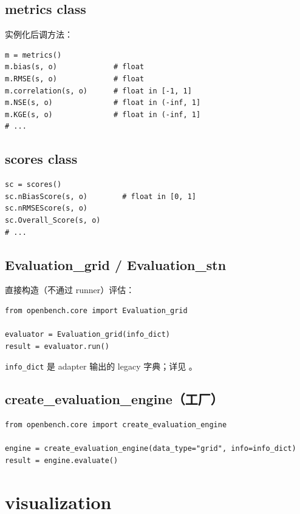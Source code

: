 \subsection{metrics class}

实例化后调方法：

\begin{verbatim}
m = metrics()
m.bias(s, o)             # float
m.RMSE(s, o)             # float
m.correlation(s, o)      # float in [-1, 1]
m.NSE(s, o)              # float in (-inf, 1]
m.KGE(s, o)              # float in (-inf, 1]
# ...
\end{verbatim}

\subsection{scores class}

\begin{verbatim}
sc = scores()
sc.nBiasScore(s, o)        # float in [0, 1]
sc.nRMSEScore(s, o)
sc.Overall_Score(s, o)
# ...
\end{verbatim}

\subsection{Evaluation\_grid / Evaluation\_stn}

直接构造（不通过 runner）评估：

\begin{verbatim}
from openbench.core import Evaluation_grid

evaluator = Evaluation_grid(info_dict)
result = evaluator.run()
\end{verbatim}

\texttt{info\_dict} 是 adapter 输出的 legacy 字典；详见 。

\subsection{create\_evaluation\_engine（工厂）}

\begin{verbatim}
from openbench.core import create_evaluation_engine

engine = create_evaluation_engine(data_type="grid", info=info_dict)
result = engine.evaluate()
\end{verbatim}

\section{visualization}

